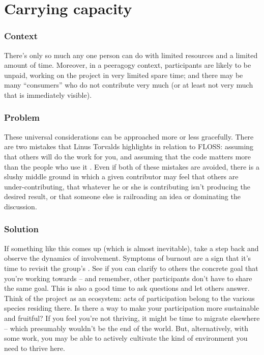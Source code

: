 \begingroup \color{OliveGreen}

\section{Carrying capacity}\label{sec:Carrying_capacity}
\subsubsection*{Context} There's only so much any one person can do with
limited resources and a limited amount of time.  Moreover, in a
peeragogy context, participants are likely to be unpaid, working on
the project in very limited spare time; and there may be many
``consumers'' who do not contribute very much (or at least not very much that is immediately visible).

\subsubsection*{Problem} These universal considerations can
be approached more or less gracefully.  There are two mistakes that
Linus Torvalds highlights in relation to FLOSS: assuming that others
will do the work for you, and assuming that the code matters more than
the people who use it \cite{torvalds-interview}.  Even if both of these mistakes are avoided,
there is a slushy middle ground in which a given contributor may feel
that others are under-contributing, that whatever he or she is
contributing isn't producing the desired result, or that someone else
is railroading an idea or dominating the discussion.

\subsubsection*{Solution} If something like this comes up (which is almost inevitable),
take a step back and observe the dynamics of involvement.  Symptoms of
burnout are a sign that it's time to revisit the group's
.  See if you can clarify to others the concrete
goal that you're working towards -- and remember, other participants
don't have to share the same goal.  This is also a good time to ask
questions and let others answer.  Think of the project as an
ecosystem: acts of participation belong to the various species
residing there.  Is there a way to make your participation more
sustainable and fruitful?  If you feel you're not thriving, it might
be time to migrate elsewhere -- which presumably wouldn't be the end
of the world.  But, alternatively, with some work, you may be able to
actively cultivate the kind of environment you need to thrive here.

